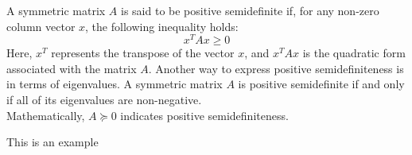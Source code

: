 \begin{definition}\label{def:positive_semidefinite}
	A symmetric matrix $A$ is said to be positive semidefinite if, for any non-zero column vector $x$, the following inequality holds:
	\begin{equation}
		x^T Ax \geq 0\label{eq:equation_test}
	\end{equation}
	Here, $x^T$ represents the transpose of the vector $x$, and $x^T Ax$ is the quadratic form associated with the matrix $A$. Another way to express positive semidefiniteness is in terms of eigenvalues. A symmetric matrix $A$ is positive semidefinite if and only if all of its eigenvalues are non-negative.\\
	Mathematically, $A \succeq 0 $ indicates positive semidefiniteness.
\end{definition}

\begin{example}\label{ex:example}
	This is an example
\end{example}


